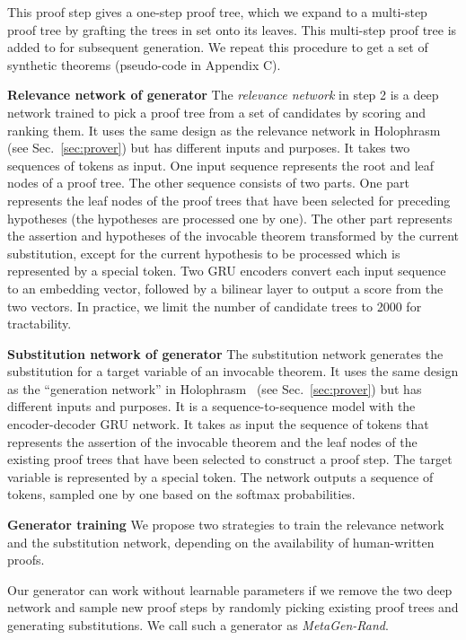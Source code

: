 \documentclass{article}
\begin{document}
This proof step gives a one-step proof tree, which we expand to a multi-step proof tree by grafting the trees in set  onto its leaves. This multi-step proof tree is added to  for subsequent generation.
We repeat this procedure to get a set of synthetic theorems 
(pseudo-code in Appendix C).

\noindent\textbf{Relevance network of generator}
The \emph{relevance network} in step 2 is a deep network trained to pick a proof tree from a set of candidates by scoring and ranking them. It uses the same design as the relevance network in Holophrasm~\cite{whalen2016holophrasm} (see Sec.~\ref{sec:prover}) but has different inputs and purposes. 
It takes two sequences of tokens as input.
One input sequence represents the root and leaf nodes of 
a proof tree.
The other sequence consists of two parts.
One part represents
the leaf nodes of the proof trees that have been selected for preceding hypotheses (the hypotheses are processed one by one).
The other part represents the assertion and hypotheses of the invocable theorem transformed by the current substitution, except for the current hypothesis to be processed which is represented by a special token. 
Two GRU encoders convert each input sequence to an embedding vector,
followed by a bilinear layer to output a score 
from the two vectors.
In practice, we limit the number of candidate trees to 2000 for tractability. 

\noindent\textbf{Substitution network of generator}
The substitution network generates the substitution for a target variable
of an invocable theorem. It uses the same design as the ``generation network'' in Holophrasm~\cite{whalen2016holophrasm} (see Sec.~\ref{sec:prover}) but has different inputs and purposes. 
It is a sequence-to-sequence model with the encoder-decoder GRU  network.
It takes as input the sequence of tokens that represents the assertion of the invocable theorem 
and the leaf nodes of the existing proof trees that have been selected to construct a proof step.
The target variable
is represented by a special token. 
The network outputs a sequence of tokens, sampled one by one based on the softmax probabilities. 
 
\noindent\textbf{Generator training}
\label{section:train generator}
We propose two strategies to train
the relevance network and the substitution network,
depending on the availability of human-written proofs. 

Our generator can work without  learnable parameters if we remove
the two deep network and sample new proof steps by randomly picking existing proof trees 
and generating substitutions.
We call such a generator as \emph{MetaGen-Rand}.
\end{document}
